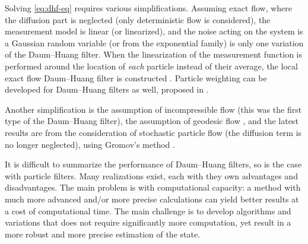 Solving \eqref{eq:dhf-eq} requires various simplifications. Assuming exact flow, where the diffusion part is neglected (only deterministic flow is considered), the measurement model is linear (or linearized), and the noise acting on the system is a Gaussian random variable (or from the exponential family) is only one variation of the Daum--Huang filter. When the linearization of the measurement function is performed around the location of \emph{each} particle instead of their average, the local exact flow Daum--Huang filter is constructed \cite{Ding2012}. Particle weighting can be developed for Daum--Huang filters as well, proposed in \cite{Li2016}.

Another simplification is the assumption of incompressible flow \cite{Daum2007}  (this was the first type of the Daum--Huang filter), the assumption of geodesic flow \cite{Daum2013}, and the latest results are from the consideration of stochastic particle flow (the diffusion term is no longer neglected), using Gromov's method \cite{Daum2018,Dai2021}.

It is difficult to summarize the performance of Daum--Huang filters, so is the case with particle filters. Many realizations exist, each with they own advantages and disadvantages. The main problem is with computational capacity: a method with much more advanced and/or more precise calculations can yield better results at a cost of computational time. The main challenge is to develop algorithms and variations that does not require significantly more computation, yet result in a more robust and more precise estimation of the state.